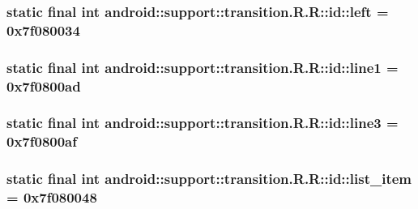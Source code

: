 \hypertarget{classandroid_1_1support_1_1transition_1_1_r_1_1id_601dfbf7311f087fcb7c0734c1b4b036}{
\subsubsection[{left}]{\setlength{\rightskip}{0pt plus 5cm}static final int android::support::transition.R.R::id::left = 0x7f080034}}
\label{classandroid_1_1support_1_1transition_1_1_r_1_1id_601dfbf7311f087fcb7c0734c1b4b036}


\hypertarget{classandroid_1_1support_1_1transition_1_1_r_1_1id_0383170c85b9fab2fd0ce5145f242466}{
\subsubsection[{line1}]{\setlength{\rightskip}{0pt plus 5cm}static final int android::support::transition.R.R::id::line1 = 0x7f0800ad}}
\label{classandroid_1_1support_1_1transition_1_1_r_1_1id_0383170c85b9fab2fd0ce5145f242466}


\hypertarget{classandroid_1_1support_1_1transition_1_1_r_1_1id_a536736c6be748da68a47fe62743f322}{
\subsubsection[{line3}]{\setlength{\rightskip}{0pt plus 5cm}static final int android::support::transition.R.R::id::line3 = 0x7f0800af}}
\label{classandroid_1_1support_1_1transition_1_1_r_1_1id_a536736c6be748da68a47fe62743f322}


\hypertarget{classandroid_1_1support_1_1transition_1_1_r_1_1id_a0e646ca4a4a5d81a1227891918cdea5}{
\subsubsection[{list\_\-item}]{\setlength{\rightskip}{0pt plus 5cm}static final int android::support::transition.R.R::id::list\_\-item = 0x7f080048}}
\label{classandroid_1_1support_1_1transition_1_1_r_1_1id_a0e646ca4a4a5d81a1227891918cdea5}


